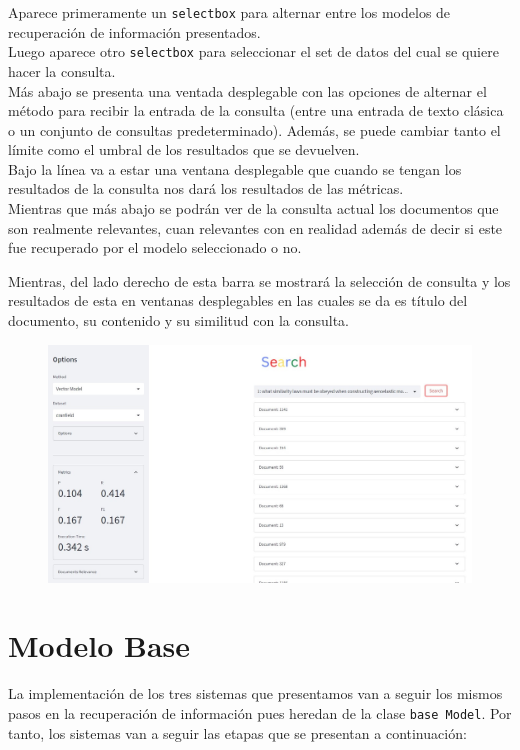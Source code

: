 \documentclass[spanish]{article}
\begin{document}
\begin{multicols}{2}
		Aparece primeramente un \texttt{selectbox} para alternar entre los modelos de recuperación de información presentados.\\

		Luego aparece otro \texttt{selectbox} para seleccionar el set de datos del cual se quiere hacer la consulta.\\

		Más abajo se presenta una ventada desplegable con las opciones de alternar el método para recibir la entrada de la consulta (entre una entrada de texto clásica o un conjunto de consultas predeterminado). Además, se puede cambiar tanto el límite como el umbral de los resultados que se devuelven.\\

		Bajo la línea va a estar una ventana desplegable que cuando se tengan los resultados de la consulta nos dará los resultados de las métricas.\\

		Mientras que más abajo se podrán ver de la consulta actual los documentos que son realmente relevantes, cuan relevantes con en realidad además de decir si este fue recuperado por el modelo seleccionado o no.\\
	\end{multicols}
		
		

		Mientras, del lado derecho de esta barra se mostrará la selección de consulta y los resultados de esta en ventanas desplegables en las cuales se da es título del documento, su contenido y su similitud con la consulta.

		\begin{figure}[H]
			\includegraphics[scale=0.38]{visual_ex.jpg}
		\end{figure}
		
	\section*{Modelo Base}
		La implementación de los tres sistemas que presentamos van a seguir los mismos pasos en la recuperación de información pues heredan de la clase \texttt{base Model}. Por tanto, los sistemas van a seguir las etapas que se presentan a continuación:
\end{document}
